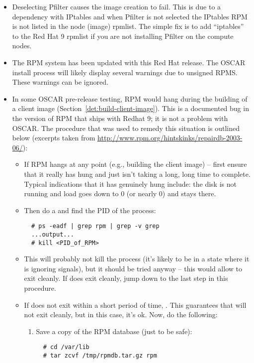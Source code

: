 \begin{itemize}

\item Deselecting Pfilter causes the image creation to fail.  This is
  due to a dependency with IPtables and when Pfilter is not selected
  the IPtables RPM is not listed in the node (image) rpmlist.   The simple
  fix is to add ``iptables'' to the Red Hat 9 rpmlist if you are not
  installing Pfilter on the compute nodes.

\item The RPM system has been updated with this Red Hat release.  The
 OSCAR install process will likely display several warnings due to unsigned
 RPMS.  These warnings can be ignored. 

\item In some OSCAR pre-release testing, RPM would hang during the
  building of a client image (Section~\ref{det:build-client-image}).
  This is a documented bug in the version of RPM that ships with
  Redhat 9; it is not a problem with OSCAR.  The procedure
  that was used to remedy this situation is outlined below (excerpts
  taken from \url{http://www.rpm.org/hintskinks/repairdb-2003-06/}):
        \begin{itemize}
        \item If RPM hangs at any point (e.g., building the client
          image) -- first ensure that it really has hung and just
          isn't taking a long, long time to complete.  Typical
          indications that it has genuinely hung include: the disk is
          not running and load goes down to 0 (or nearly 0) and stays
          there.
          
        \item Then do a  and find the PID of the 
          process:
\begin{verbatim}
  # ps -eadf | grep rpm | grep -v grep
  ...output...
  # kill <PID_of_RPM>
\end{verbatim}
          
        \item This will probably not kill the process (it's likely to
          be in a state where it is ignoring signals), but it should
          be tried anyway -- this would allow  to exit
          cleanly.  If  does exit cleanly, jump down to the
          last step in this procedure.
          
        \item If  does not exit within a short period of
          time, .  This guarantees that
           will not exit cleanly, but in this case, it's ok.
          Now, do the following:
                        \begin{enumerate}
                        \item Save a copy of the RPM database (just to
                          be safe):
\begin{verbatim}
  # cd /var/lib
  # tar zcvf /tmp/rpmdb.tar.gz rpm
\end{verbatim}
                          

\end{enumerate}
\end{itemize}
\end{itemize}
